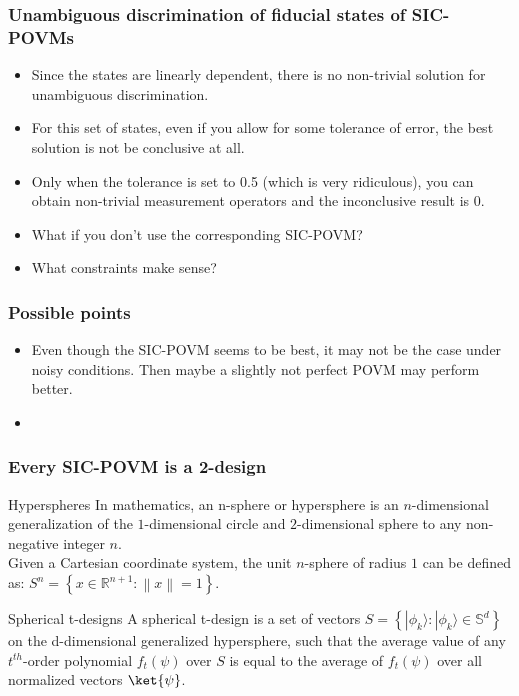 \documentclass{beamer}
\begin{document}
\begin{frame}
  \frametitle{Unambiguous discrimination of fiducial states of SIC-POVMs}
  \begin{itemize}
    \item Since the states are linearly dependent, there is no non-trivial solution for unambiguous discrimination.
    \item For this set of states, even if you allow for some tolerance of error, the best solution is not be conclusive at all.
    \item Only when the tolerance is set to 0.5 (which is very ridiculous), you can obtain non-trivial measurement
          operators and the inconclusive result is 0.
    \item What if you don't use the corresponding SIC-POVM?
    \item What constraints make sense?
  \end{itemize}
\end{frame}

\begin{frame}
  \frametitle{Possible points}
  \begin{itemize}
    \item Even though the SIC-POVM seems to be best, it may not be the case
          under noisy conditions. Then maybe a slightly not perfect POVM may
          perform better.
    \item
  \end{itemize}
\end{frame}

\begin{frame}
  \frametitle{Every SIC-POVM is a 2-design}
  \begin{block}{Hyperspheres}
    In mathematics, an n-sphere or hypersphere is an ${\displaystyle
          n}$-dimensional generalization of the ${\displaystyle 1}$-dimensional
    circle and ${\displaystyle 2}$-dimensional sphere to any non-negative
    integer ${\displaystyle n}$. \\
    Given a Cartesian coordinate system, the unit ${\displaystyle n}$-sphere
    of radius ${\displaystyle 1}$ can be defined as: ${\displaystyle S^{n}=\left\{x\in \mathbb {R} ^{n+1}:
          \left\|x\right\|=1\right\}.}$
  \end{block}
  \begin{block}{Spherical t-designs}
    A spherical t-design is a set of vectors ${\displaystyle S=\left\{|\phi _{k}\rangle :|\phi _{k}\rangle \in \mathbb {S}
          ^{d}\right\}}$ on the d-dimensional generalized hypersphere, such that the
    average value of any ${\displaystyle t^{th}}$-order polynomial
    ${\displaystyle f_{t}(\psi )}$ over ${\displaystyle S}$ is equal to the
    average of ${\displaystyle f_{t}(\psi )}$ over all normalized
    vectors $\ket{\psi}$.
  \end{block}
\end{frame}
\end{document}

